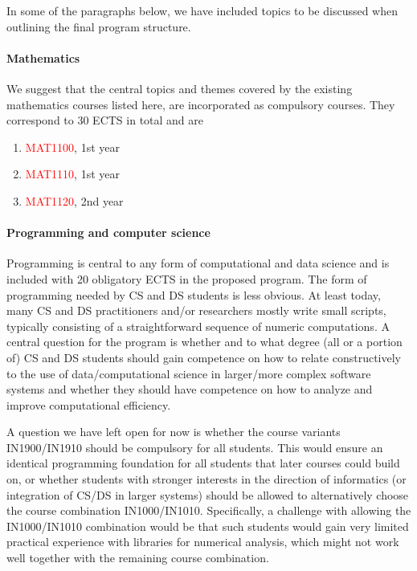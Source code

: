 \documentclass[oneside,final,10pt]{article}
\begin{document}
In some of the paragraphs below, we have included topics to be discussed when outlining the final program structure. 

\paragraph{Mathematics}
We suggest that the central topics and themes covered by the existing mathematics courses listed here, are incorporated as compulsory courses. They correspond to 
30 ECTS in total and are
\begin{enumerate}
\color{red}
    \item \textcolor{red}{MAT1100}, 1st year
    \item \textcolor{red}{MAT1110}, 1st year
    \item \textcolor{red}{MAT1120}, 2nd year
\end{enumerate}

\paragraph{Programming and computer science}
Programming is central to any form of computational and data science and is included with 20 obligatory ECTS in the proposed program. The form of programming needed by CS and DS students is less obvious. At least today, many CS and DS practitioners and/or researchers mostly write small scripts, typically consisting of a straightforward sequence of numeric computations. A central question for the program is whether and to what degree (all or a portion of) CS and DS students should gain competence on how to relate constructively to the use of data/computational science in larger/more complex software systems and whether they should have competence on how to analyze and improve computational efficiency. 

A question we have left open for now is whether the course variants IN1900/IN1910 should be compulsory for all students. This would ensure an identical programming foundation for all students that later courses could build on, or whether students with stronger interests in the direction of informatics (or integration of CS/DS in larger systems) should be allowed to alternatively choose the course combination IN1000/IN1010. Specifically, a challenge with allowing the IN1000/IN1010 combination would be that such students would gain very limited practical experience with libraries for numerical analysis, which might not work well together with the remaining course combination.
\end{document}
